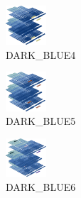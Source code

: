 \hspace{0.1cm}
\begin{minipage}[b]{0.15\linewidth}
\begin{figure}[H]                                                          
  \centering                                                             
  \begin{adjustbox}{width=1.5cm,center}                                   
  \includegraphics[width=1.5cm]{src/colorspace_colourflow/flows/colourflow_148-45.png}%
  \end{adjustbox}                                                        
\caption*{DARK\_BLUE4}                                           
\end{figure}                                                               
\end{minipage}
\hspace{0.1cm}
\begin{minipage}[b]{0.15\linewidth}
\begin{figure}[H]                                                          
  \centering                                                             
  \begin{adjustbox}{width=1.5cm,center}                                   
  \includegraphics[width=1.5cm]{src/colorspace_colourflow/flows/colourflow_149-45.png}%
  \end{adjustbox}                                                        
\caption*{DARK\_BLUE5}                                           
\end{figure}                                                               
\end{minipage}
\hspace{0.1cm}
\begin{minipage}[b]{0.15\linewidth}
\begin{figure}[H]                                                          
  \centering                                                             
  \begin{adjustbox}{width=1.5cm,center}                                   
  \includegraphics[width=1.5cm]{src/colorspace_colourflow/flows/colourflow_150-45.png}%
  \end{adjustbox}                                                        
\caption*{DARK\_BLUE6}                                           
\end{figure}                                                               
\end{minipage}
